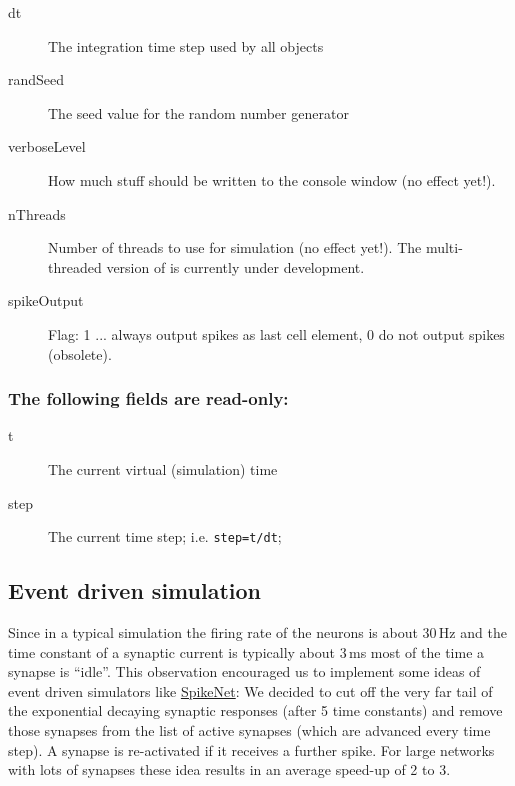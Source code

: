 \begin{description}

\item[dt] The integration time step used by all objects

\item[randSeed] The seed value for the random number generator

\item[verboseLevel] How much stuff should be written to the
  console window (no effect yet!).
  
\item[nThreads] Number of threads to use for simulation (no
  effect yet!). The multi-threaded version of \csim is currently under
  development.

\item[spikeOutput] Flag: 1 ... always output spikes as last cell element, 0 do not
  output spikes (obsolete).

\end{description}

\subsubsection*{The following fields are read-only:}

\begin{description}

\item[t] The current virtual (simulation) time
  
\item[step] The current time step; i.e.  \texttt{step=t/dt};

\end{description}

\subsection{Event driven simulation}

Since in a typical simulation the firing rate of the neurons is about
30\,Hz and the time constant of a synaptic current is typically about
3\,ms most of the time a synapse is ``idle''. This observation
encouraged us to implement some ideas of event driven simulators like
\href{http://www.cnl.salk.edu/~arno/spikenet/}{SpikeNet}:
We decided to cut off the very far tail of the exponential decaying
synaptic responses (after 5 time constants) and remove those synapses
from the list of active synapses (which are advanced every time step).
A synapse is re-activated if it receives a further spike. For large
networks with lots of synapses these idea results in an average
speed-up of 2 to 3.

